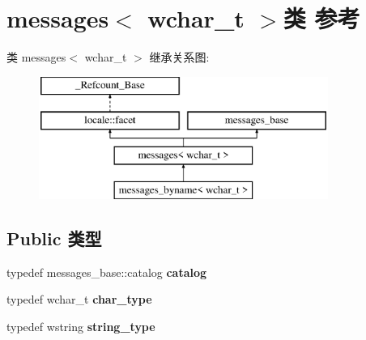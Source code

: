 \hypertarget{classmessages_3_01wchar__t_01_4}{}\section{messages$<$ wchar\+\_\+t $>$类 参考}
\label{classmessages_3_01wchar__t_01_4}
类 messages$<$ wchar\+\_\+t $>$ 继承关系图\+:\begin{figure}[H]
\begin{center}
\leavevmode
\includegraphics[height=4.000000cm]{classmessages_3_01wchar__t_01_4}
\end{center}
\end{figure}
\subsection*{Public 类型}
\begin{DoxyCompactItemize}
\item 
\mbox{\label{classmessages_3_01wchar__t_01_4_ae7ce5f0797e7d1cbd181e776cbdfef03}} 
typedef messages\+\_\+base\+::catalog {\bfseries catalog}
\item 
\mbox{\label{classmessages_3_01wchar__t_01_4_a07741237d75b5b58defb02ad4224547a}} 
typedef wchar\+\_\+t {\bfseries char\+\_\+type}
\item 
\mbox{\label{classmessages_3_01wchar__t_01_4_a8cb128c1a821cca79861602c343f49f0}} 
typedef wstring {\bfseries string\+\_\+type}
\end{DoxyCompactItemize}
